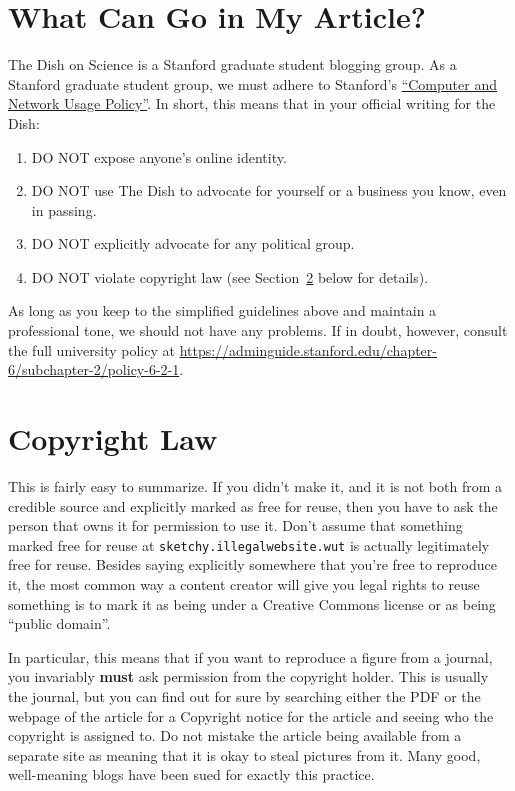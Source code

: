 \documentclass[paper=a4, fontsize=11pt]{scrartcl}
\numberwithin{equation}{section}        %
\numberwithin{figure}{section}            %
\numberwithin{table}{section}                %
\begin{document}
\section{What Can Go in My Article?}
The Dish on Science is a Stanford graduate student blogging group.
As a Stanford graduate student group, we must adhere to Stanford's
\href{https://adminguide.stanford.edu/chapter-6/subchapter-2/policy-6-2-1}{``Computer
and Network Usage Policy''}. In short, this means that in your official writing
for the Dish:\@
\begin{enumerate}
    \item DO NOT expose anyone's online identity.
    \item DO NOT use The Dish to advocate for yourself or a business you know,
        even in passing.
    \item DO NOT explicitly advocate for any political group.
    \item DO NOT violate copyright law (see
        Section~\ref{sec:copyright} below for details).
\end{enumerate}

As long as you keep to the simplified guidelines above and maintain a
professional tone, we should not have any problems. If in doubt, however,
consult the full university policy at
\url{https://adminguide.stanford.edu/chapter-6/subchapter-2/policy-6-2-1}.

\section{Copyright Law}\label{sec:copyright}

This is fairly easy to summarize. If you didn't make it, and it is not both from
a credible source and explicitly marked as free for reuse, then you have to ask
the person that owns it for permission to use it. Don't assume that something
marked free for reuse at \texttt{sketchy.illegalwebsite.wut} is actually
legitimately free for reuse.  Besides saying explicitly somewhere that you're
free to reproduce it, the most common way a content creator will give you legal
rights to reuse something is to mark it as being under a Creative Commons
license or as being ``public domain''.

In particular, this means that if you want to reproduce a figure from a journal,
you invariably \textbf{must} ask permission from the copyright holder. This is
usually the journal, but you can find out for sure by searching either the PDF
or the webpage of the article for a Copyright notice for the article and seeing
who the copyright is assigned to. Do not mistake the article being available
from a separate site as meaning that it is okay to steal pictures from it. Many
good, well-meaning blogs have been sued for exactly this practice.
\end{document}
